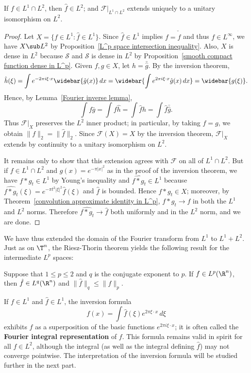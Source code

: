 \begin{theorem}
If $f\in L^1\cap L^2$, then $\hat{f}\in L^2$; and $\mathcal{F}|_{L^1\cap L^2}$ extends uniquely to a unitary isomorphism on $L^2$.
\end{theorem}
\begin{proof}
Let $X=\{f\in L^1:\hat{f}\in L^1\}$. Since $\hat{f}\in L^1$ implies $f=\check{\hat{f}}$ and thus $f\in L^\infty$, we have $X\sub L^2$ by Proposition~\ref{L^p space intersection inequality}. Also, $X$ is dense in $L^2$ because $\mathscr{S}$ and $\mathscr{S}$ is dense in $L^2$ by Proposition~\ref{smooth compact function dense in L^p}. Given $f,g\in X$, let $h=\bar{\hat{g}}$. By the inversion theorem,
\[\hat{h}(\xi)=\int e^{-2\pi i\xi\cdot x}\widebar{\hat{g}(x)}\,dx=\widebar{\int e^{2\pi i\xi\cdot x}\hat{g}(x)\,dx}=\widebar{g(\xi)}.\]
Hence, by Lemma~\ref{Fourier inverse lemma},
\[\int f\bar{g}=\int f\hat{h}=\int\hat{f}h=\int\hat{f}\bar{\hat{g}}.\]
Thus $\mathcal{F}|_{X}$ preserves the $L^2$ inner product; in particular, by taking $f=g$, we obtain $\|f\|_2=\|\hat{f}\|_2$. Since $\mathcal{F}(X)=X$ by the inversion theorem, $\mathcal{F}|_X$ extends by continuity to a unitary isomorphism on $L^2$.\par
It remains only to show that this extension agrees with $\mathcal{F}$ on all of $L^1\cap L^2$. But if $f\in L^1\cap L^2$ and $g(x)=e^{-\pi|x|^2}$ as in the proof of the inversion theorem, we have $f\ast g_t\in L^1$ by Young's inequality and $\widehat{f\ast g_t}\in L^1$ because $\widehat{f\ast g_t}(\xi)=e^{-\pi t^2|\xi|^2}\hat{f}(\xi)$ and $\hat{f}$ is bounded. Hence $f\ast g_t\in X$; moreover, by Theorem~\ref{convolution approximate identity in L^p}, $f\ast g_t\to f$ in both the $L^1$ and $L^2$ norms. Therefore $\widehat{f\ast g_t}\to\hat{f}$ both uniformly and in the $L^2$ norm, and we are done.
\end{proof}
We have thus extended the domain of the Fourier transform from $L^1$ to $L^1+L^2$. Just as on $\T^n$, the Riesz-Thorin theorem yields the following result for the intermediate $L^p$ spaces:
\begin{theorem}
Suppose that $1\leq p\leq 2$ and $q$ is the conjugate exponent to $p$. If $f\in L^p(\R^n)$, then $\hat{f}\in L^q(\R^n)$ and $\|\hat{f}\|_q\leq\|f\|_p$.
\end{theorem}
If $f\in L^1$ and $\hat{f}\in L^1$, the inversion formula
\[f(x)=\int\hat{f}(\xi)e^{2\pi\xi\cdot x}\,d\xi\]
exhibits $f$ as a superposition of the basic functions $e^{2\pi i\xi\cdot x}$; it is often called the \textbf{Fourier integral representation} of $f$. This formula remains valid in spirit for all $f\in L^2$, although the integral (as well as the integral defining $\hat{f}$) may not converge pointwise. The interpretation of the inversion formula will be studied further in the next part.\par
